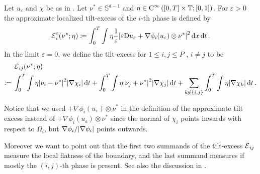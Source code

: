 \begin{comment}Using the equipartition of 
energies (\Cref{equipartition_of_energies_multiphase}) which tells us that $ 
\varepsilon / 2 \abs{ \nabla u_{ \varepsilon } }^{ 2 } $ roughly equals $ 1 / 
\varepsilon W ( u_{ \varepsilon } ) $, we come up with the following definition 
which is similar to the tilt-excess defined in the twophase case.
\end{comment}

\begin{definition}
	Let $ u _{ \varepsilon } $ and $ \chi $ be as in 
	.
	Let $ \nu^{ \ast } \in \mathbb{ S }^{ d - 1 } $ and $ \eta \in \operatorname{C}^{ 
		\infty } \left( [ 0 , T ] \times \operatorname{\mathbb{T}} ; [ 0 , 1 ] \right) $. For 
		$ 
	\varepsilon > 0 $  the 
	approximate localized tilt-excess of the $ i$-th phase is defined by
	\begin{equation*}
		\tilt_excess_{ i }^{ \varepsilon } ( \nu^{ \ast } ; \eta )
		\coloneqq
		\int_{ 0 }^{ T }
		\int
		\eta
		\frac{ 1 }{ \varepsilon }
		\abs{ 
			\varepsilon \diff u_{ \varepsilon } 
			+
			\nabla \phi_{ i } ( u_{ \varepsilon } ) 
			\otimes
			\nu^{ \ast }
		}^{ 2 }
		\dd{ x }
		\dd{ t }.
	\end{equation*}
	In the limit $ \varepsilon = 0 $,
	we define the tilt-excess for $ 1 \leq i, j \leq P $ , $ i \neq j $ to be
	\begin{align*}
		&\tilt_excess_{ i j } ( \nu^{ \ast } ; \eta  ) 
		\\
		\coloneqq{} &
		\int_{ 0 }^{ T }
		\int
		\eta
		\abs{ \nu_{ i } - \nu^{ \ast } }^{ 2 }
		\abs{ \nabla \chi_{ i } }
		\dd{ t }
		+
		\int_{ 0 }^{ T }
		\int
		\eta
		\abs{ \nu_{ j } + \nu^{ \ast } }^{ 2 }
		\abs{ \nabla \chi_{ j } }
		\dd{ t }
		+
		\sum_{ k \notin \{ i , j \} }
		\int_{ 0 }^{ T }
		\int
		\eta 
		\abs{ \nabla \chi_{ k } }
		\dd{ t }.
	\end{align*}
\end{definition}

Notice that we used $ + \nabla \phi_{ i } ( u_{ \varepsilon } ) \otimes \nu^{ 
	\ast } $ in the definition of the approximate tilt excess instead of 
$ + \nabla \phi_{ i } ( u_{ \varepsilon } ) \otimes \nu^{ 
	\ast } $ since the normal of $ \chi_{ i } $ points inwards with respect to 
	$ 
\Omega_{ i } $, but $ \nabla \phi_{ i } / \abs{ \nabla \phi_{ i } } $ points 
outwards.

Moreover we want to point out that the first two summands of the tilt-excess $ 
\tilt_excess_{ i j } $ measure the local flatness of the boundary, and the 
last summand measures if mostly the $(i,j)$-th phase is present. See also the 
discussion in .

